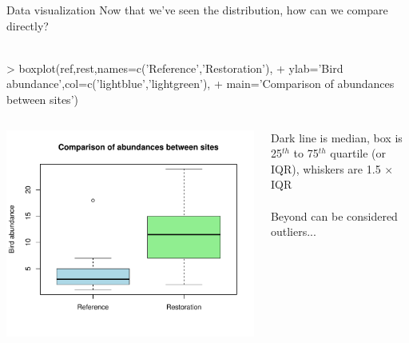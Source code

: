 \documentclass[xcolor=svgnames]{beamer}
\begin{document}
\begin{frame}[fragile]{Data visualization}
Now that we've seen the distribution, how can we compare directly?\\~\\
\begin{Schunk}
\begin{Sinput}
> boxplot(ref,rest,names=c('Reference','Restoration'),
+ 	ylab='Bird abundance',col=c('lightblue','lightgreen'),
+ 	main='Comparison of abundances between sites')
\end{Sinput}
\end{Schunk}
\begin{columns}
\begin{column}{0.6\textwidth}
\begin{center}
\includegraphics[width=\textwidth,trim=0in 0in 0.3in 0.3in]{R_for_data_analysis-box2.pdf}
\end{center}
\end{column}
\begin{column}{0.4\textwidth}
Dark line is median, box is 25$^{th}$ to 75$^{th}$ quartile (or IQR), whiskers are 1.5 $\times$ IQR\\~\\
Beyond can be considered outliers...
\end{column}
\end{columns}
\end{frame}
\end{document}
